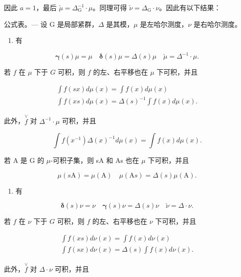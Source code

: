 因此 \(a = 1\)，最后 \(\check{\mu} = \Delta_{\mathrm{G}}^{-1}\cdot \mu\)。同理可得 \(\check{\nu} = \Delta_{\mathrm{G}}\cdot \nu\)。因此有以下结果：

公式表。--- 设 G 是局部紧群，\(\Delta\) 是其模，\(\mu\) 是左哈尔测度，\(\nu\) 是右哈尔测度。

\begin{enumerate}
\def\labelenumi{\arabic{enumi})}
\tightlist
\item
  有
\end{enumerate}

\[
\boldsymbol {\gamma} (s) \mu = \mu \quad \boldsymbol {\delta} (s) \mu = \Delta (s) \mu \quad \check {\mu} = \Delta^ {- 1} \cdot \mu .\tag{20}
\]

若 \(f\) 在 \(\mu\) 下于 \(G\) 可积，则 \(f\) 的左、右平移也在 \(\mu\) 下可积，并且

\[
\begin{array}{l} \int f (s x) d \mu (x) = \int f (x) d \mu (x) \\ \int f (x s) d \mu (x) = \Delta (s) ^ {- 1} \int f (x) d \mu (x). \end{array}\tag{21}
\]

此外，\(\stackrel{\vee}{f}\) 对 \(\Delta^{-1} \cdot \mu\) 可积，并且

\[
\int f (x ^ {- 1}) \Delta (x) ^ {- 1} d \mu (x) = \int f (x) d \mu (x).\tag{22}
\]

若 A 是 G 的 \(\mu\)-可积子集，则 sA 和 As 也在 \(\mu\) 下可积，并且

\[
\mu (s \mathrm{A}) = \mu (\mathrm{A}) \quad \mu (\mathrm{A} s) = \Delta (s) \mu (\mathrm{A}).\tag{23}
\]

\begin{enumerate}
\def\labelenumi{\arabic{enumi})}
\setcounter{enumi}{1}
\tightlist
\item
  有
\end{enumerate}

\[
\boldsymbol {\delta} (s) \nu = \nu \quad \boldsymbol {\gamma} (s) \nu = \Delta (s) \nu \quad \check {\nu} = \Delta \cdot \nu .\tag{24}
\]

若 \(f\) 在 \(\nu\) 下于 \(G\) 可积，则 \(f\) 的左、右平移也在 \(\nu\) 下可积，并且

\[
\begin{array}{l} \int f (x s) d \nu (x) = \int f (x) d \nu (x) \\ \int f (s x) d \nu (x) = \Delta (s) \int f (x) d \nu (x). \end{array}\tag{25}
\]

此外，\(\stackrel{\vee}{f}\) 对 \(\Delta \cdot \nu\) 可积，并且

